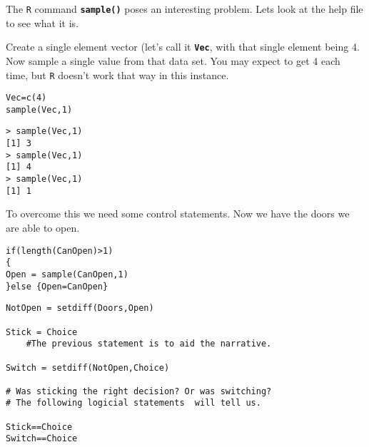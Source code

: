 The \texttt{R} command \texttt{\textbf{sample()}} poses an interesting problem. Lets look at the help file to see what it is.

Create a single element vector (let's call it \texttt{\textbf{Vec}}, with that single element being 4. Now sample a single value from that data set. You may expect to get 4 each time, but \texttt{R} doesn’t work that way in this instance.

\begin{framed}
\begin{verbatim}
Vec=c(4)
sample(Vec,1)
\end{verbatim}
\end{framed}

\begin{verbatim}
> sample(Vec,1)
[1] 3
> sample(Vec,1)
[1] 4
> sample(Vec,1)
[1] 1
\end{verbatim}
To overcome this we need some control statements. Now we have the doors we are able to open.

\begin{framed}
\begin{verbatim}
if(length(CanOpen)>1)
{
Open = sample(CanOpen,1)
}else {Open=CanOpen}
\end{verbatim}
\end{framed}


\begin{framed}
\begin{verbatim}
NotOpen = setdiff(Doors,Open)

Stick = Choice
    #The previous statement is to aid the narrative.

Switch = setdiff(NotOpen,Choice)

# Was sticking the right decision? Or was switching?
# The following logicial statements  will tell us.

Stick==Choice
Switch==Choice
\end{verbatim}
\end{framed}


